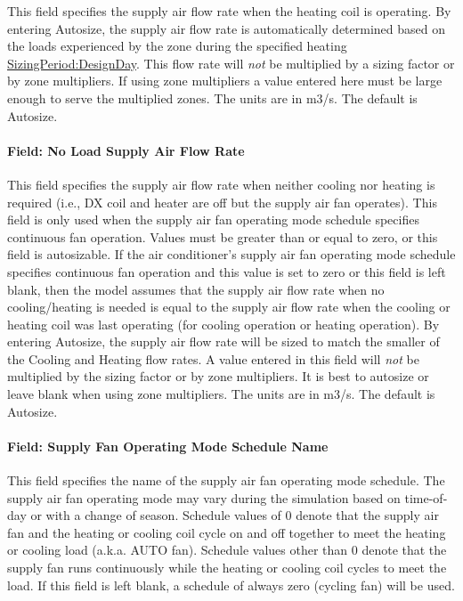 This field specifies the supply air flow rate when the heating coil is operating. By entering Autosize, the supply air flow rate is automatically determined based on the loads experienced by the zone during the specified heating \hyperref[sizingperioddesignday]{SizingPeriod:DesignDay}. This flow rate will \emph{not} be multiplied by a sizing factor or by zone multipliers. If using zone multipliers a value entered here must be large enough to serve the multiplied zones. The units are in m3/s. The default is Autosize.

\paragraph{Field: No Load Supply Air Flow Rate}\label{field-no-load-supply-air-flow-rate-4}

This field specifies the supply air flow rate when neither cooling nor heating is required (i.e., DX coil and heater are off but the supply air fan operates). This field is only used when the supply air fan operating mode schedule specifies continuous fan operation. Values must be greater than or equal to zero, or this field is autosizable. If the air conditioner's supply air fan operating mode schedule specifies continuous fan operation and this value is set to zero or this field is left blank, then the model assumes that the supply air flow rate when no cooling/heating is needed is equal to the supply air flow rate when the cooling or heating coil was last operating (for cooling operation or heating operation). By entering Autosize, the supply air flow rate will be sized to match the smaller of the Cooling and Heating flow rates. A value entered in this field will \emph{not} be multiplied by the sizing factor or by zone multipliers. It is best to autosize or leave blank when using zone multipliers. The units are in m3/s. The default is Autosize.

\paragraph{Field: Supply Fan Operating Mode Schedule Name}\label{field-supply-fan-operating-mode-schedule-name-6}

This field specifies the name of the supply air fan operating mode schedule. The supply air fan operating mode may vary during the simulation based on time-of-day or with a change of season. Schedule values of 0 denote that the supply air fan and the heating or cooling coil cycle on and off together to meet the heating or cooling load (a.k.a. AUTO fan). Schedule values other than 0 denote that the supply fan runs continuously while the heating or cooling coil cycles to meet the load. If this field is left blank, a schedule of always zero (cycling fan) will be used.

